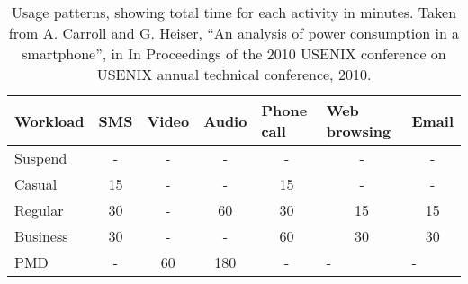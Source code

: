 \documentclass[conference]{IEEEtran}
\begin{document}
\begin{table}[h]
\begin{tabular}{|l|c|c|c|c|c|c|}
\hline
Workload & \multicolumn{1}{l|}{SMS} & \multicolumn{1}{l|}{Video} & \multicolumn{1}{l|}{Audio} & \multicolumn{1}{l|}{Phone call} & \multicolumn{1}{l|}{Web browsing} & \multicolumn{1}{l|}{Email} \\ \hline
Suspend  & -                        & -                          & -                          & -                               & -                                 & -                          \\ \hline
Casual   & 15                       & -                          & -                          & 15                              & -                                 & -                          \\ \hline
Regular  & 30                       & -                          & 60                         & 30                              & 15                                & 15                         \\ \hline
Business & 30                       & -                          & -                          & 60                              & 30                                & 30                         \\ \hline
PMD      & -                        & 60                         & 180                        & -                               & \multicolumn{1}{l|}{-}            & \multicolumn{1}{l|}{-}     \\ \hline
\end{tabular}
\caption {Usage patterns, showing total time for each activity in minutes. Taken from  A. Carroll and G. Heiser, ``An analysis of power consumption in a smartphone'', in In Proceedings of the 2010 USENIX conference on USENIX annual technical conference, 2010.}
\end{table}
  
\end{document}
